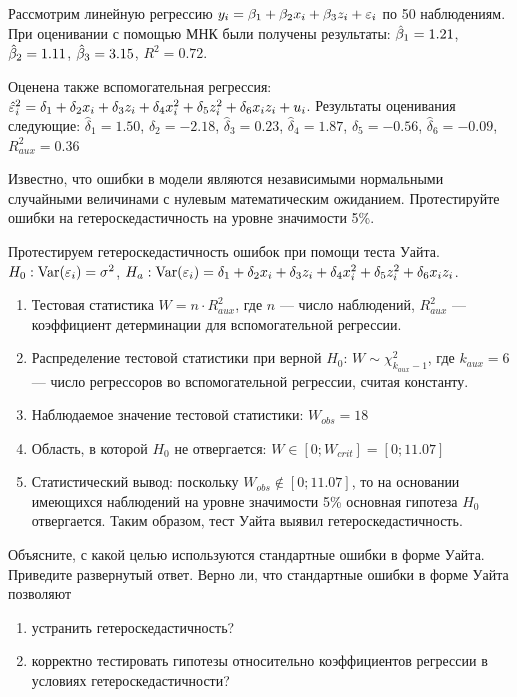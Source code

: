 \begin{problem}
Рассмотрим линейную регрессию $y_i = \beta_1 + \beta_2 x_i + \beta_3 z_i + \varepsilon_i$ по 50 наблюдениям. При оценивании с помощью МНК были получены результаты: $\hat{\beta}_1=1.21$, $\hat{\beta}_2=1.11$, $\hat{\beta}_3=3.15$, $R^2=0.72$.

Оценена также вспомогательная регрессия: $\hat{\varepsilon}^2_i=\delta_1+\delta_2 x_i +\delta_3 z_i+\delta_4 x_i^2+\delta_5 z_i^2+\delta_6 x_i z_i + u_i$. Результаты оценивания следующие: $\hat{\delta}_1=1.50$, $\hat{\delta}_2=-2.18$,  $\hat{\delta}_3=0.23$,  $\hat{\delta}_4=1.87$,  $\hat{\delta}_5=-0.56$,  $\hat{\delta}_6=-0.09$,  $R^2_{aux}=0.36$


Известно, что ошибки в модели являются независимыми нормальными случайными величинами с нулевым математическим ожиданием. Протестируйте
ошибки на гетероскедастичность на уровне значимости 5\%.


\begin{sol}
Протестируем гетероскедастичность ошибок при помощи теста Уайта. $H_0: \operatorname{Var}(\varepsilon_i)=\sigma^2$, $H_a: \operatorname{Var}(\varepsilon_i)=\delta_1+\delta_2 x_i +\delta_3 z_i+\delta_4 x_i^2+\delta_5 z_i^2+\delta_6 x_i z_i$.
\begin{enumerate}
\item Тестовая статистика $W=n\cdot R^2_{aux}$, где $n$ — число наблюдений, $R^2_{aux}$ — коэффициент детерминации для вспомогательной регрессии.
\item Распределение тестовой статистики при верной $H_0$: $W\sim \chi^2_{k_{aux}-1}$, где $k_{aux}=6$ — число регрессоров во вспомогательной регрессии, считая константу.
\item Наблюдаемое значение тестовой статистики: $W_{obs}=18$
\item Область, в которой $H_0$ не отвергается: $W\in [0;W_{crit}]=[0;11.07]$
\item Статистический вывод: поскольку $W_{obs} \notin [0;11.07]$, то на основании имеющихся наблюдений на уровне значимости 5\% основная гипотеза $H_0$ отвергается. Таким образом, тест Уайта выявил гетероскедастичность.
\end{enumerate}
\end{sol}
\end{problem}




\begin{problem}
Объясните, с какой целью используются стандартные ошибки в форме Уайта. Приведите развернутый ответ. Верно ли, что стандартные ошибки в форме Уайта позволяют
\begin{enumerate}
\item устранить гетероскедастичность?
\item корректно тестировать гипотезы относительно коэффициентов регрессии в условиях гетероскедастичности?
\end{enumerate}


\begin{sol}
\end{sol}
\end{problem}



